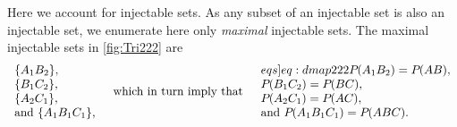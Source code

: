 {Here we account for injectable sets. As any subset of an injectable set is also an injectable set, we enumerate here only \emph{maximal} injectable sets. The maximal injectable sets in \cref{fig:Tri222} are
\begin{align}
\begin{array}{l}
\brackets{A_1 B_2},\\
\brackets{B_1 C_2},\\
\brackets{A_2 C_1},\\
\text{and }\brackets{A_1 B_1 C_1},
\end{array}
\quad\text{which in turn imply that}\quad
\begin{array}{l}\label[eqs]{eq:dmap222}
\pdf{A_1 B_2}=\pdf{A B},\\
\pdf{B_1 C_2}=\pdf{B C},\\
\pdf{A_2 C_1}=\pdf{A C},\\
\text{and }\pdf{A_1 B_1 C_1}=\pdf{A B C}.
\end{array}\end{align}

}
